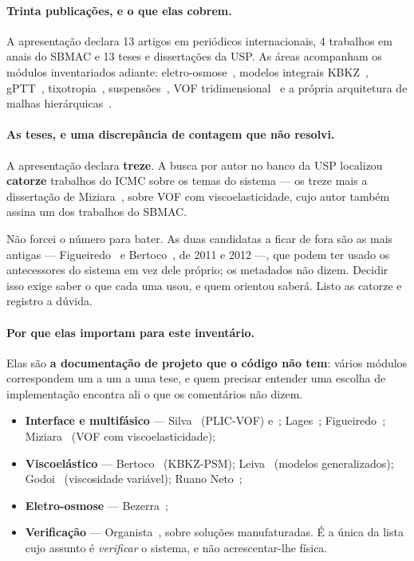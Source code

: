 \paragraph{Trinta publica\c{c}\~oes, e o que elas cobrem.} A apresenta\c{c}\~ao
declara 13 artigos em peri\'odicos internacionais, 4 trabalhos em anais do SBMAC
e 13 teses e disserta\c{c}\~oes da USP. As \'areas acompanham os m\'odulos
inventariados adiante: eletro-osmose~\cite{bezerra2019}, modelos integrais
{KBKZ}~\cite{bertoco2021kbkz,bertoco2023}, {gPTT}~\cite{bertoco2021gptt},
tixotropia~\cite{castillo2023}, suspens\~oes~\cite{castillo2025}, VOF
tridimensional~\cite{silva2023} e a pr\'opria arquitetura de malhas
hier\'arquicas~\cite{castelo2021,castillo2022,leiva2024}.

\paragraph{As teses, e uma discrep\^ancia de contagem que n\~ao resolvi.}
A apresenta\c{c}\~ao declara \textbf{treze}. A busca por autor no banco da USP
localizou \textbf{catorze} trabalhos do ICMC sobre os temas do sistema --- os
treze mais a disserta\c{c}\~ao de Miziara~\cite{miziara2020}, sobre VOF com
viscoelasticidade, cujo autor tamb\'em assina um dos trabalhos do SBMAC.

N\~ao forcei o n\'umero para bater. As duas candidatas a ficar de fora s\~ao as
mais antigas --- Figueiredo~\cite{figueiredo2011} e Bertoco~\cite{bertoco2012},
de 2011 e 2012 ---, que podem ter usado os antecessores do sistema em vez dele
pr\'oprio; os metadados n\~ao dizem. Decidir isso exige saber o que cada uma
usou, e quem orientou saber\'a. Listo as catorze e registro a d\'uvida.

\paragraph{Por que elas importam para este invent\'ario.}
Elas s\~ao \textbf{a documenta\c{c}\~ao de projeto que o c\'odigo n\~ao tem}:
v\'arios m\'odulos correspondem um a um a uma tese, e quem precisar entender uma
escolha de implementa\c{c}\~ao encontra ali o que os coment\'arios n\~ao dizem.

\begin{itemize}
  \item \textbf{Interface e multif\'asico} --- Silva~\cite{silva2020ms}
    (PLIC-VOF) e~\cite{silva2025dr}; Lages~\cite{lages2016ms,lages2023dr};
    Figueiredo~\cite{figueiredo2011,figueiredo2016};
    Miziara~\cite{miziara2020} (VOF com viscoelasticidade);
  \item \textbf{Viscoel\'astico} --- Bertoco~\cite{bertoco2012,bertoco2017}
    (KBKZ-PSM); Leiva~\cite{leiva2022} (modelos generalizados);
    Godoi~\cite{godoi2022} (viscosidade vari\'avel);
    Ruano Neto~\cite{ruano2025};
  \item \textbf{Eletro-osmose} --- Bezerra~\cite{bezerra2019tese};
  \item \textbf{Verifica\c{c}\~ao} --- Organista~\cite{organista2025}, sobre
    solu\c{c}\~oes manufaturadas. \'E a \'unica da lista cujo assunto \'e
    \emph{verificar} o sistema, e n\~ao acrescentar-lhe f\'isica.
\end{itemize}

